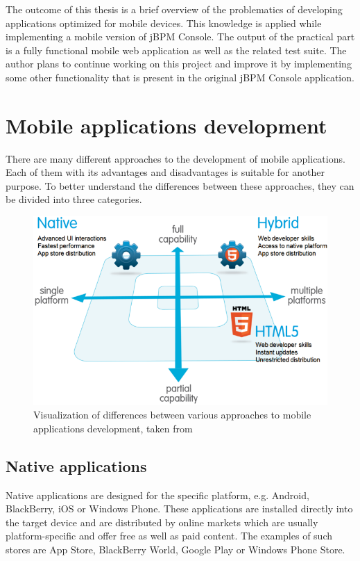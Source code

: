 \documentclass[12pt,oneside,final]{fithesis2}
\begin{document}
The outcome of this thesis is a brief overview of the problematics of developing applications optimized for mobile devices.
This knowledge is applied while implementing a mobile version of jBPM Console.
The output of the practical part is a fully functional mobile web application as well as the related test suite.
The author plans to continue working on this project and improve it by implementing some other functionality that is present in the original jBPM Console application.

\chapter{Mobile applications development}
\label{chap:chapter2}
There are many different approaches to the development of mobile applications.
Each of them with its advantages and disadvantages is suitable for another purpose.
To better understand the differences between these approaches, they can be divided into three categories.

\begin{figure}[ht!]
\centering
\includegraphics[width=\textwidth]{images/native-html5-hybrid.png}
\caption{Visualization of differences between various approaches to mobile applications development, taken from \cite{developerforce}}
\label{fig:native-html5-hybrid}
\end{figure}

\section{Native applications}
Native applications are designed for the specific platform, e.g. Android, BlackBerry, iOS or Windows Phone.
These applications are installed directly into the target device and are distributed by online markets which are usually platform-specific and offer free as well as paid content.
The examples of such stores are App Store\footnotemark{}, BlackBerry World\footnotemark{}, Google Play\footnotemark{} or Windows Phone Store\footnotemark{}.
\end{document}
